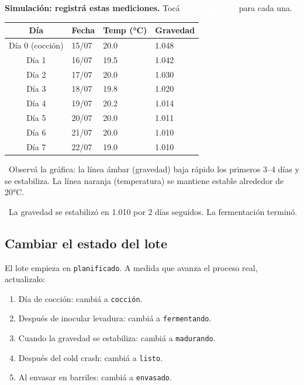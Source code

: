 \documentclass[11pt,a4paper]{report}
\newcommand{\appbtn}[1]{%
  \textcolor{white}{\colorbox{beer}{\footnotesize\sffamily\bfseries\ #1}}%
}
\begin{document}
\begin{simbox}
\textbf{Simulación: registrá estas mediciones.} Tocá \appbtn{+ Registrar} para cada una.

\medskip
\begin{tabular}{clll}
\toprule
\textbf{Día} & \textbf{Fecha} & \textbf{Temp (°C)} & \textbf{Gravedad} \\
\midrule
Día 0 (cocción)  & 15/07  & 20.0  & 1.048 \\
Día 1            & 16/07  & 19.5  & 1.042 \\
Día 2            & 17/07  & 20.0  & 1.030 \\
Día 3            & 18/07  & 19.8  & 1.020 \\
Día 4            & 19/07  & 20.2  & 1.014 \\
Día 5            & 20/07  & 20.0  & 1.011 \\
Día 6            & 21/07  & 20.0  & 1.010 \\
Día 7            & 22/07  & 19.0  & 1.010 \\
\bottomrule
\end{tabular}

\medskip
\textcolor{accent}{\faEye\ Observá la gráfica:} la línea ámbar (gravedad) baja rápido los primeros 3--4 días y se estabiliza. La línea naranja (temperatura) se mantiene estable alrededor de 20°C.

\medskip
\textcolor{accent}{\faArrowRight\ La gravedad se estabilizó en 1.010 por 2 días seguidos. La fermentación terminó.}
\end{simbox}

\subsection{Cambiar el estado del lote}

El lote empieza en \texttt{planificado}. A medida que avanza el proceso real, actualizalo:

\begin{enumerate}[leftmargin=*]
  \item Día de cocción: cambiá a \texttt{cocción}.
  \item Después de inocular levadura: cambiá a \texttt{fermentando}.
  \item Cuando la gravedad se estabiliza: cambiá a \texttt{madurando}.
  \item Después del cold crash: cambiá a \texttt{listo}.
  \item Al envasar en barriles: cambiá a \texttt{envasado}.
\end{enumerate}
\end{document}
